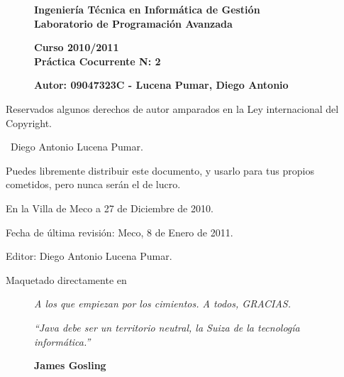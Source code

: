 \begin{figure}[hc]
\begin{titlepage}
\begin{center}
{\Large \textbf{Ingenier\'ia T\'ecnica en Inform\'atica de Gesti\'on\\Laboratorio de Programaci\'on Avanzada}}
\end{center}
\end{titlepage}
\end{figure}
\begin{figure}[hc]
\begin{center}
{\Large \textbf{Curso 2010/2011\\Pr\'actica Cocurrente N: 2}}
\end{center}
\end{figure}
\begin{figure}[hc]
\begin{center}
{\large \textbf{Autor: 09047323C - Lucena Pumar, Diego Antonio}}
\end{center}
\end{figure}
\newpage
Reservados algunos derechos de autor amparados en la Ley internacional del
Copyright.


\textcopyright\ Diego Antonio Lucena Pumar.



Puedes libremente distribuir este documento, y usarlo para tus propios
cometidos, pero nunca ser\'an el de lucro.



En la Villa de Meco a 27 de Diciembre de 2010.


Fecha de \'ultima revisi\'on: Meco, 8 de Enero de 2011.


Editor: Diego Antonio Lucena Pumar.


Maquetado directamente en \LaTeXe


\newpage
\begin{figure}[hc]
\begin{flushright}
\textit{\textit{A los que empiezan por los cimientos. A todos, GRACIAS.}}
\end{flushright}
\end{figure}
\newpage{\pagestyle{empty}\cleardoublepage}
\begin{figure}[c]
\begin{flushright}
\textit{``Java debe ser un territorio neutral, la Suiza de la tecnolog\'ia inform\'atica.''}
\end{flushright}
\begin{flushright}
\textbf{James Gosling}
\end{flushright}
\end{figure}
